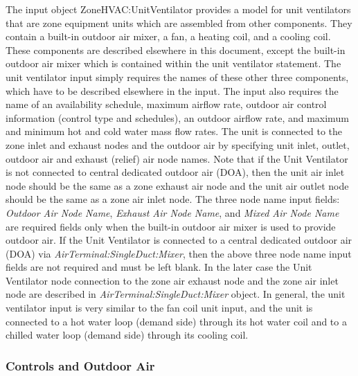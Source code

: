 The input object ZoneHVAC:UnitVentilator provides a model for unit ventilators that are zone equipment units which are assembled from other components. They contain a built-in outdoor air mixer, a fan, a heating coil, and a cooling coil. These components are described elsewhere in this document, except the built-in outdoor air mixer which is contained within the unit ventilator statement. The unit ventilator input simply requires the names of these other three components, which have to be described elsewhere in the input. The input also requires the name of an availability schedule, maximum airflow rate, outdoor air control information (control type and schedules), an outdoor airflow rate, and maximum and minimum hot and cold water mass flow rates. The unit is connected to the zone inlet and exhaust nodes and the outdoor air by specifying unit inlet, outlet, outdoor air and exhaust (relief) air node names. Note that if the Unit Ventilator is not connected to central dedicated outdoor air (DOA), then the unit air inlet node should be the same as a zone exhaust air node and the unit air outlet node should be the same as a zone air inlet node. The three node name input fields: \textit{Outdoor Air Node Name}, \textit{Exhaust Air Node Name}, and \textit{Mixed Air Node Name} are required fields only when the built-in outdoor air mixer is used to provide outdoor air. If the Unit Ventilator is connected to a central dedicated outdoor air (DOA) via \textit{AirTerminal:SingleDuct:Mixer}, then the above three node name input fields are not required and must be left blank. In the later case the Unit Ventilator node connection to the zone air exhaust node and the zone air inlet node are described in \textit{AirTerminal:SingleDuct:Mixer} object. In general, the unit ventilator input is very similar to the fan coil unit input, and the unit is connected to a hot water loop (demand side) through its hot water coil and to a chilled water loop (demand side) through its cooling coil.

\subsubsection{Controls and Outdoor Air}\label{controls-and-outdoor-air}

